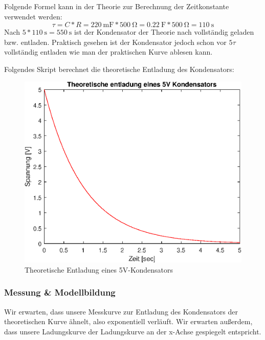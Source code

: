 Folgende Formel kann in der Theorie zur Berechnung der Zeitkonstante verwendet werden:
\[
\tau = C * R = \SI{220}{\milli\farad} * \SI{500}{\ohm} = \SI{0.22}{\farad} * \SI{500}{\ohm} = \SI{110}{\second}
\]
Nach $5 * \SI{110}{\second} = \SI{550}{\second}$ ist der Kondensator der Theorie nach vollständig geladen bzw. entladen.
Praktisch gesehen ist der Kondensator jedoch schon vor $5\tau$ vollständig entladen wie man der praktischen Kurve ablesen kann. \cite{Fachkundebuch}

Folgendes Skript berechnet die theoretische Entladung des Kondensators:


\begin{figure}[htb]
\centering
\includegraphics[width=14cm]{pictures/Kondensator/5-V-Theorie.eps}
\caption{Theoretische Entladung eines 5V-Kondensators}
\label{fig:entladung-theorie}
\end{figure}

\clearpage
\subsubsection{Messung \& Modellbildung}


Wir erwarten, dass unsere Messkurve zur Entladung des Kondensators der theoretischen Kurve ähnelt, also exponentiell verläuft. Wir erwarten außerdem, dass unsere Ladungskurve der Ladungskurve an der x-Achse gespiegelt entspricht.

